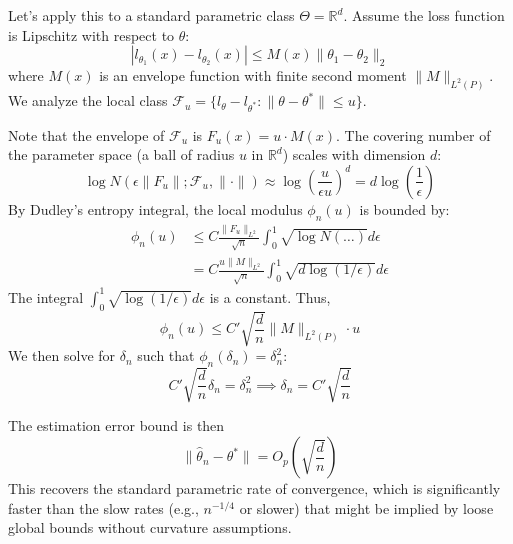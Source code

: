 \begin{eg}
    Let's apply this to a standard parametric class $\Theta = \mathbb{R}^d$. Assume the loss function is Lipschitz with respect to $\theta$:
$$
|l_{\theta_1}(x) - l_{\theta_2}(x)| \le M(x) \|\theta_1 - \theta_2\|_2
$$
where $M(x)$ is an envelope function with finite second moment $\|M\|_{L^2(P)}$.
We analyze the local class $\mathcal{F}_u = \{l_\theta - l_{\theta^*} : \|\theta - \theta^*\| \le u\}$.

Note that the envelope of $\mathcal{F}_u$ is $F_u(x) = u \cdot M(x)$. The covering number of the parameter space (a ball of radius $u$ in $\mathbb{R}^d$) scales with dimension $d$:
$$
\log N(\epsilon \|F_u\|; \mathcal{F}_u, \|\cdot\|) \approx \log \left( \frac{u}{\epsilon u} \right)^d = d \log \left(\frac{1}{\epsilon}\right)
$$
By Dudley's entropy integral, the local modulus $\phi_n(u)$ is bounded by:
\begin{align*}
\phi_n(u) &\le C \frac{\|F_u\|_{L^2}}{\sqrt{n}} \int_0^1 \sqrt{\log N(\dots)} d\epsilon \\
&= C \frac{u \|M\|_{L^2}}{\sqrt{n}} \int_0^1 \sqrt{d \log(1/\epsilon)} d\epsilon
\end{align*}
The integral $\int_0^1 \sqrt{\log(1/\epsilon)} d\epsilon$ is a constant. Thus,
$$
\phi_n(u) \le C' \sqrt{\frac{d}{n}} \|M\|_{L^2(P)} \cdot u
$$
We then solve for $\delta_n$ such that $\phi_n(\delta_n) = \delta_n^2$:
$$
C' \sqrt{\frac{d}{n}} \delta_n = \delta_n^2 \implies \delta_n = C' \sqrt{\frac{d}{n}}
$$

The estimation error bound is then
$$
\|\hat{\theta}_n - \theta^*\| = O_p\left( \sqrt{\frac{d}{n}} \right)
$$
This recovers the standard parametric rate of convergence, which is significantly faster than the slow rates (e.g., $n^{-1/4}$ or slower) that might be implied by loose global bounds without curvature assumptions.
\end{eg}

